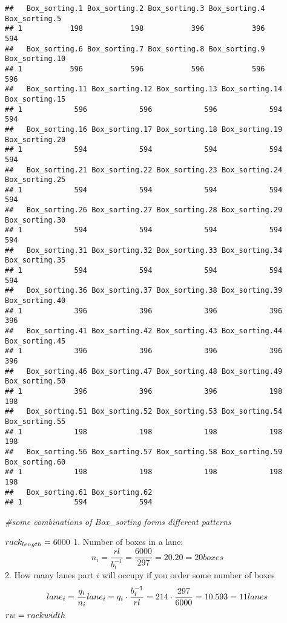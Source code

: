 \documentclass[
]{article}
\newenvironment{Shaded}{\begin{snugshade}}{\end{snugshade}}
\newcommand{\CommentTok}[1]{\textcolor[rgb]{0.56,0.35,0.01}{\textit{#1}}}
\begin{document}
\begin{verbatim}
##   Box_sorting.1 Box_sorting.2 Box_sorting.3 Box_sorting.4 Box_sorting.5
## 1           198           198           396           396           594
##   Box_sorting.6 Box_sorting.7 Box_sorting.8 Box_sorting.9 Box_sorting.10
## 1           596           596           596           596            596
##   Box_sorting.11 Box_sorting.12 Box_sorting.13 Box_sorting.14 Box_sorting.15
## 1            596            596            596            594            594
##   Box_sorting.16 Box_sorting.17 Box_sorting.18 Box_sorting.19 Box_sorting.20
## 1            594            594            594            594            594
##   Box_sorting.21 Box_sorting.22 Box_sorting.23 Box_sorting.24 Box_sorting.25
## 1            594            594            594            594            594
##   Box_sorting.26 Box_sorting.27 Box_sorting.28 Box_sorting.29 Box_sorting.30
## 1            594            594            594            594            594
##   Box_sorting.31 Box_sorting.32 Box_sorting.33 Box_sorting.34 Box_sorting.35
## 1            594            594            594            594            594
##   Box_sorting.36 Box_sorting.37 Box_sorting.38 Box_sorting.39 Box_sorting.40
## 1            396            396            396            396            396
##   Box_sorting.41 Box_sorting.42 Box_sorting.43 Box_sorting.44 Box_sorting.45
## 1            396            396            396            396            396
##   Box_sorting.46 Box_sorting.47 Box_sorting.48 Box_sorting.49 Box_sorting.50
## 1            396            396            396            198            198
##   Box_sorting.51 Box_sorting.52 Box_sorting.53 Box_sorting.54 Box_sorting.55
## 1            198            198            198            198            198
##   Box_sorting.56 Box_sorting.57 Box_sorting.58 Box_sorting.59 Box_sorting.60
## 1            198            198            198            198            198
##   Box_sorting.61 Box_sorting.62
## 1            594            594
\end{verbatim}

\begin{Shaded}
\begin{Highlighting}[]
\CommentTok{#some combinations of Box_sorting forms different patterns}
\end{Highlighting}
\end{Shaded}

\(rack_{length}=6000 \\\) 1. Number of boxes in a lane:
\[n_i=\frac {rl}{b_i^{-1}}=\frac {6000}{297}=20.20=20boxes\] 2. How many
lanes part \(i\) will occupy if you order some number of boxes
\[lane_i=\frac {q_i}{n_i}\\lane_i=q_i \cdot \frac {b_i^{-1}}{rl}=214 \cdot \frac {297}{6000}=10.593= 11 \space lanes \]
\(rw= rack \space width\)
\end{document}
